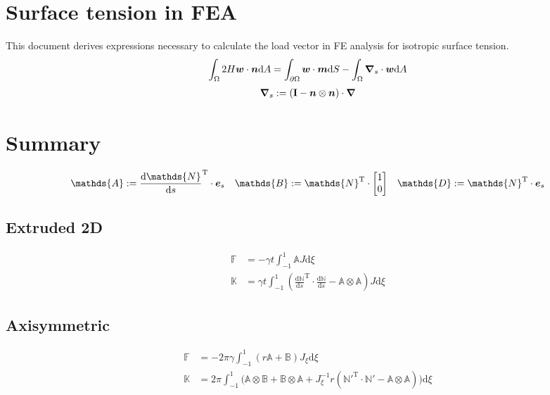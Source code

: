 \documentclass[a4paper,11pt]{article}
\renewcommand{\to}[1]{\text{\boldmath $#1$}} %
\newcommand{\ts}[1]{\text{\boldmath $\mathrm{#1}$}} %
\newcommand{\uv}[1]{\mathds{#1}}
\newcommand{\um}[1]{\mathds{#1}}
\newcommand{\intd}[1]{\mathrm{d}#1}
\newcommand{\dderiv}[2]{\frac{\mathrm{d}#1}{\mathrm{d}#2}}
\newcommand{\T}{\mathrm{T}}
\newcommand{\defeq}{:=}
\newcommand{\boundary}{\text{boundary}}
\DeclareMathOperator{\sign}{sign}
\begin{document}
\section{Surface tension in FEA}
This document derives expressions necessary to calculate the load vector in FE analysis for isotropic surface tension.
\begin{align}
 \int_\Omega 2 H \to w\cdot \to n\intd A = \int_{\partial\Omega} \to w\cdot\to m\intd S - \int_\Omega \to \nabla_s \cdot \to w \intd A
 \label{eq:curvature}
\end{align}
\begin{align}
 \to \nabla_s \defeq \left(\ts I - \to n\otimes\to n \right)\cdot \to \nabla
\end{align}

\section{Summary}
\begin{align}
\uv A &\defeq \dderiv{{\um N}}{s}^\T \cdot \to e_s & \uv B &\defeq {\um N}^\T \cdot \begin{bmatrix}1\\0\end{bmatrix} & \uv D \defeq \uv N^\T \cdot \to e_s
\end{align}
\subsection{Extruded 2D}
\begin{align}
 \uv F &= -\gamma t \int_{-1}^{1} \uv A J\intd\xi\\
 \um K &= \gamma t \int_{-1}^{1} \left(\dderiv{\um N}{s}^\T\cdot\dderiv{\um N}{s} - \uv A\otimes\uv A\right) J \intd\xi
\end{align}

\subsection{Axisymmetric}
\begin{align}
  \uv F &= -2\pi \gamma \int_{-1}^{1} \left(r\uv A + \uv B\right) J_\xi\intd\xi\\
  \um K &= 2\pi \int_{-1}^{1} \bigg(
	\uv A \otimes \uv B +
	\uv B\otimes \uv A +
	J_\xi^{-1} r({\um N}'^\T \cdot {\um N}' - \uv A\otimes \uv A)
	\bigg)\intd\xi
\end{align}
\end{document}
